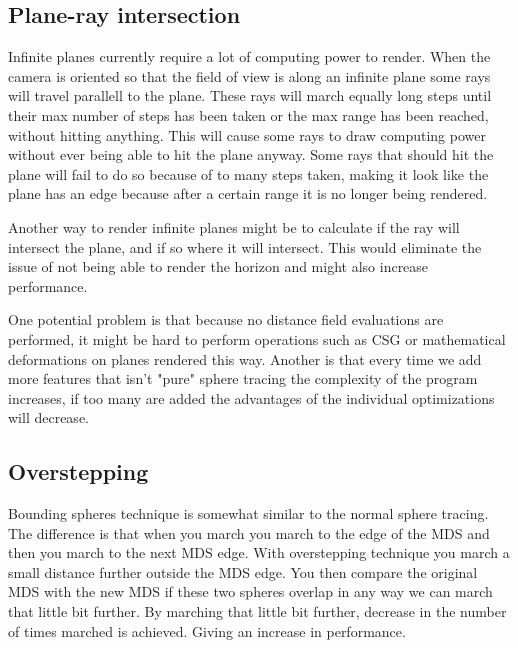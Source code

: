 		\subsection{Plane-ray intersection}

			Infinite planes currently require a lot of computing power to render. When
			the camera is oriented so that the field of view is along an infinite
			plane some rays will travel parallell to the plane. These rays will march 
			equally long steps until their max number of steps has been taken or
			the max range has been reached, without hitting anything. This will 
			cause some rays to draw computing power without ever being able to
			hit the plane anyway. Some rays that should hit the plane will fail
			to do so because of to many steps taken, making it look like the plane 
			has an edge because after a certain range it is no longer being rendered.


			Another way to render infinite planes might be to 
			calculate if the ray will intersect the plane, and if so where it 
			will intersect. This would eliminate the issue of not being able 
			to render the horizon and might also increase performance.

			One potential problem is that because no distance field evaluations 
			are performed, it might be hard to perform operations such as CSG or
			mathematical deformations on planes rendered this way. Another is 
			that every time we add more features that isn't "pure" sphere tracing
			the complexity of the program increases, if too many are added the 
			advantages of the individual optimizations will decrease.

		\subsection{Overstepping}

			Bounding spheres technique is somewhat similar to the normal sphere
			tracing. The difference is that when you march you march to the
			edge of the MDS and then you march to the next MDS edge. With
			overstepping technique you march a small distance further
			outside the MDS edge. You then compare the original MDS with the
			new MDS if these two spheres overlap in any way we can march that
			little bit further. By marching that little bit further, decrease
			in the number of times marched is achieved. Giving an increase in
			performance. 
			
